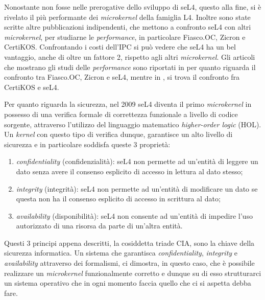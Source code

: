 Nonostante non fosse nelle prerogative dello sviluppo di seL4, questo alla fine, si è rivelato il più performante dei \textit{microkernel} della famiglia L4. Inoltre sono state scritte altre pubblicazioni indipendenti, che mettono a confronto seL4 con altri \textit{microkernel}, per studiarne le \textit{performance}, in particolare Fiasco.OC, Zicron e CertiKOS. Confrontando i costi dell'IPC si può vedere che seL4 ha un bel vantaggio, anche di oltre un fattore 2, rispetto agli altri \textit{microkernel}.
Gli articoli che mostrano gli studi delle \textit{performance} sono riportati in \cite{skybridge} per quanto riguarda il confronto tra Fiasco.OC, Zicron e seL4, mentre in \cite{CertiKOS}, si trova il confronto fra CertiKOS e seL4.

Per quanto riguarda la sicurezza, nel 2009 seL4 diventa il primo \textit{microkernel} in possesso di una verifica formale di correttezza funzionale a livello di codice sorgente, attraverso l'utilizzo del linguaggio matematico \textit{higher-order logic} (HOL). Un \textit{kernel} con questo tipo di verifica dunque, garantisce un alto livello di sicurezza e in particolare soddisfa queste 3 proprietà:
\begin{enumerate}
	\item \textit{confidentiality} (confidenzialità): seL4 non permette ad un'entità di leggere un dato senza avere il consenso esplicito di accesso in lettura al dato stesso;
	\item \textit{integrity} (integrità): seL4 non permette ad un'entità di modificare un dato se questa non ha il consenso esplicito di accesso in scrittura al dato;
	\item \textit{availability} (disponibilità): seL4 non consente ad un'entità di impedire l'uso autorizzato di una risorsa da parte di un'altra entità.
\end{enumerate}

Questi 3 principi appena descritti, la cosiddetta triade CIA, sono la chiave della sicurezza informatica. Un sistema che garantisca \textit{confidentiality}, \textit{integrity} e \textit{availability} attraverso dei formalismi, ci dimostra, in questo caso, che è possibile realizzare un \textit{microkernel} funzionalmente corretto e dunque su di esso strutturarci un sistema operativo che in ogni momento faccia quello che ci si aspetta debba fare.